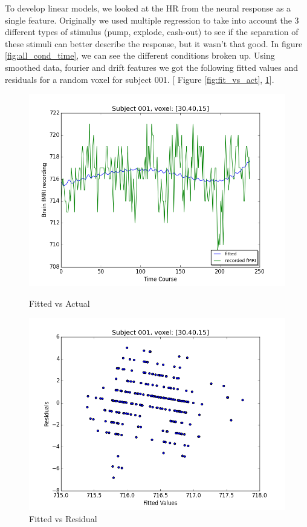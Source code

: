 \par To develop linear models, we looked at the HR from the neural response 
as a single feature. Originally we used multiple regression to take into 
account the 3 different types of stimulus (pump, explode, cash-out) to see if 
the separation of these stimuli can better describe the response, but it wasn't 
that good. In figure \ref{fig:all_cond_time}, we can see the different 
conditions broken up. Using smoothed data, fourier and drift features we got 
the following fitted values and residuals for a random voxel for subject 001. [
Figure \ref{fig:fit_vs_act}, \ref{fig:fit_vs_res}].

  
\begin{figure}[ht]
\centering
\begin{minipage}[b]{0.45\linewidth}
	\centering
	\includegraphics[width=.8\linewidth]{images/Fitted_v_Actual.png} 
	\caption{Fitted vs Actual}
	\label{fig:fit_vs_act}
\end{minipage}	
\quad
\begin{minipage}[b]{0.45\linewidth}
	\centering
		\includegraphics[width=.8\linewidth]{images/Fitted_v_Residuals.png} 
	\caption{Fitted vs Residual}
	\label{fig:fit_vs_res}
\end{minipage}
\end{figure}




